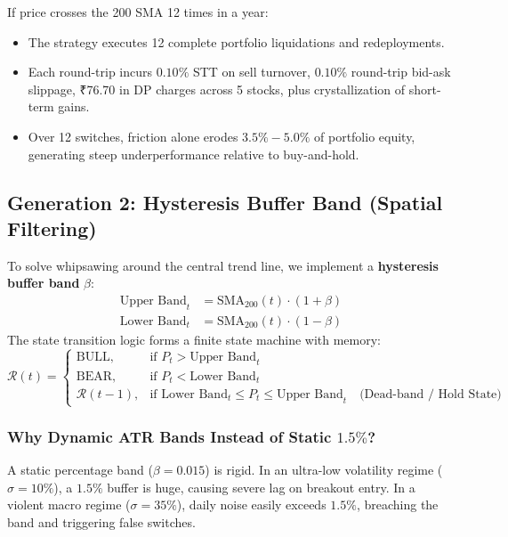\documentclass[11pt,a4paper]{article}
\begin{document}
If price crosses the 200 SMA 12 times in a year:
\begin{itemize}
    \item The strategy executes 12 complete portfolio liquidations and redeployments.
    \item Each round-trip incurs $0.10\%$ STT on sell turnover, $0.10\%$ round-trip bid-ask slippage, ₹76.70 in DP charges across 5 stocks, plus crystallization of short-term gains.
    \item Over 12 switches, friction alone erodes $3.5\% - 5.0\%$ of portfolio equity, generating steep underperformance relative to buy-and-hold.
\end{itemize}

\subsection{Generation 2: Hysteresis Buffer Band (Spatial Filtering)}
To solve whipsawing around the central trend line, we implement a \textbf{hysteresis buffer band} $\beta$:
\begin{align}
\text{Upper Band}_t &= \text{SMA}_{200}(t) \cdot (1 + \beta) \\
\text{Lower Band}_t &= \text{SMA}_{200}(t) \cdot (1 - \beta)
\end{align}
The state transition logic forms a finite state machine with memory:
\begin{equation}
\mathcal{R}(t) = 
\begin{cases}
\text{BULL}, & \text{if } P_t > \text{Upper Band}_t \\
\text{BEAR}, & \text{if } P_t < \text{Lower Band}_t \\
\mathcal{R}(t-1), & \text{if } \text{Lower Band}_t \le P_t \le \text{Upper Band}_t \quad \text{(Dead-band / Hold State)}
\end{cases}
\end{equation}

\subsubsection{Why Dynamic ATR Bands Instead of Static $1.5\%$?}
A static percentage band ($\beta = 0.015$) is rigid. In an ultra-low volatility regime ($\sigma = 10\%$), a $1.5\%$ buffer is huge, causing severe lag on breakout entry. In a violent macro regime ($\sigma = 35\%$), daily noise easily exceeds $1.5\%$, breaching the band and triggering false switches.
\end{document}
